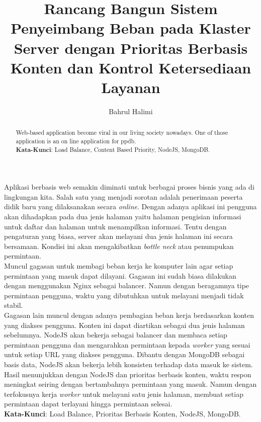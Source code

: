 \documentclass{ta-its}
\title{Rancang Bangun Sistem Penyeimbang Beban pada Klaster Server dengan Prioritas Berbasis Konten dan Kontrol Ketersediaan Layanan}{Design and Implementation of Load Balancing System with Content Priority and Availability Control}{KI1502}
\author{Bahrul Halimi}{5111100014}
\begin{document}
    \frontmatter %
    \maketitle
    \legalityPaper %
    \begin{abstrak}
    	Aplikasi berbasis web semakin diminati untuk berbagai proses bisnis yang ada di lingkungan kita. Salah satu yang menjadi sorotan adalah penerimaan peserta didik baru yang dilaksanakan secara \textit{online}. Dengan adanya aplikasi ini pengguna akan dihadapkan pada dua jenis halaman yaitu halaman pengisian informasi untuk daftar dan halaman untuk menampilkan informasi. Tentu dengan pengaturan yang biasa, server akan melayani dua jenis halaman ini secara bersamaan. Kondisi ini akan mengakibatkan \textit{bottle neck} atau penumpukan permintaan. \\
	    Muncul gagasan untuk membagi beban kerja ke komputer lain agar setiap permintaan yang masuk dapat dilayani. Gagasan ini sudah biasa dilakukan dengan menggunakan Nginx sebagai balancer. Namun dengan beragamnya tipe permintaan pengguna, waktu yang dibutuhkan untuk melayani menjadi tidak stabil. \\
	    Gagasan lain muncul dengan adanya pembagian beban kerja berdasarkan konten yang diakses pengguna. Konten ini dapat diartikan sebagai dua jenis halaman sebelumnya. NodeJS akan bekerja sebagai balancer dan membaca setiap permintaan pengguna dan mengarahkan permintaan kepada \textit{worker} yang sesuai untuk setiap URL yang diakses pengguna. Dibantu dengan MongoDB sebagai basis data, NodeJS akan bekerja lebih konsisten terhadap data masuk ke sistem. \\
	    Hasil menunjukkan dengan NodeJS dan prioritas berbasis konten, waktu respon meningkat seiring dengan bertambahnya permintaan yang masuk. Namun dengan terfokusnya kerja \textit{worker} untuk melayani satu jenis halaman, membuat setiap permintaan dapat terlayani hingga permintaan selesai. \\
    	
    	\noindent \textbf{Kata-Kunci}: Load Balance, Prioritas Berbasis Konten, NodeJS, MongoDB.
	\end{abstrak}
	
	\cleardoublepage
   \begin{abstract}
	   	Web-based application become viral in our living society nowadays. One of those application is an on line application for ppdb. \\
    	
    	
    	\noindent \textbf{Kata-Kunci}: Load Balance, Content Based Priority, NodeJS, MongoDB.
	\end{abstract}
	
\end{document}
